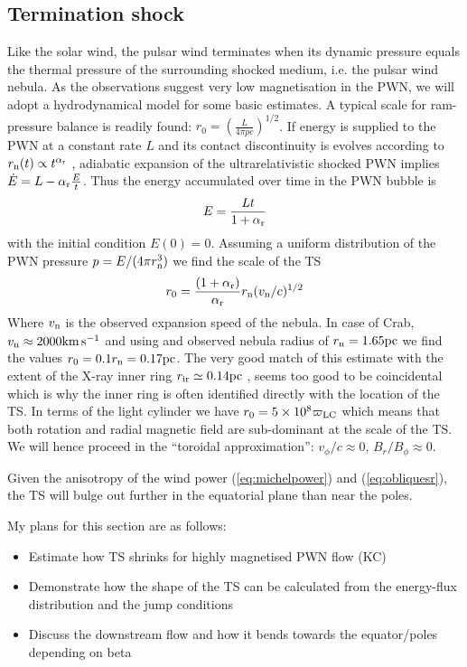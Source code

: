 \subsection{Termination shock}

Like the solar wind, the pulsar wind terminates when its dynamic pressure equals the thermal pressure of the surrounding shocked medium, i.e. the pulsar wind nebula.  
As the observations suggest very low magnetisation in the PWN, we will adopt a hydrodynamical model for some basic estimates.  A typical scale for ram-pressure balance is readily found: $r_0=\left(\frac{L}{4\pi p c}\right)^{1/2}$.  If energy is supplied to the PWN at a constant rate $L$ and its contact discontinuity is evolves according to $r_{\rm n}(t)\propto t^{\alpha_{\rm r}}$ \citep[where we will adopt $\alpha_{\rm r}=6/5$][]{Chevalier1977}, adiabatic expansion of the ultrarelativistic shocked PWN implies $\dot{E} = L-\alpha_{\rm r}\frac{E}{t}$.  Thus the energy accumulated over time in the PWN bubble is
\begin{align}
E= \frac{L t}{1+\alpha_{\rm r}}
\end{align}
with the initial condition $E(0)=0$. Assuming a uniform distribution of the PWN pressure $p=E/(4\pi r_{\rm n}^3)$ we find the scale of the TS
\begin{align}
r_0 = \frac{(1+\alpha_{\rm r})}{\alpha_{\rm r}} r_{\rm n}(v_{\rm n}/c)^{1/2}
\end{align}
Where $v_{\rm n}$ is the observed expansion speed of the nebula. In case of Crab, $v_{\rm n}\approx 2000 \rm km\, s^{-1}$ and using and observed nebula radius of  $r_{\rm n}=1.65\rm pc$ \citep{hester2008} we find the values $r_0=0.1 r_{\rm n}=0.17\rm pc$.  
The very good match of this estimate with the extent of the X-ray inner ring $r_{\rm ir}\simeq 0.14\rm pc$ \citep{weisskopf2000}, seems too good to be coincidental which is why the inner ring is often identified directly with the location of the TS.   
In terms of the light cylinder we have $r_0=5\times 10^8 \varpi_{\rm LC}$ which means that both rotation and radial magnetic field  are sub-dominant at the scale of the TS.  We will hence proceed in the ``toroidal approximation'': $v_\phi/c\approx 0$, $B_r/B_\phi \approx0$.  

Given the anisotropy of the wind power (\ref{eq:michelpower}) and (\ref{eq:obliquesr}), the TS will bulge out further in the equatorial plane than near the poles.  

My plans for this section are as follows:
\begin{itemize}
\item
Estimate how TS shrinks for highly magnetised PWN flow (KC)
\item
Demonstrate how the shape of the TS can be calculated from the energy-flux distribution and the jump conditions
\item
Discuss the downstream flow and how it bends towards the equator/poles depending on beta
\end{itemize}

